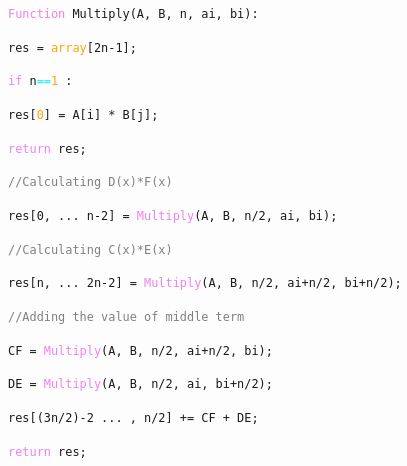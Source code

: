 \documentclass{article}
\theoremstyle{definition}
\theoremstyle{example}
\begin{document}
\vspace{3mm}
\noindent \texttt{\textcolor{violet}{Function} Multiply(A, B, n, ai, bi):} \par
\noindent \hspace{10mm} \texttt{res = \textcolor{orange}{array}[2n-1];}\par
\noindent \hspace{10mm} \texttt{\textcolor{violet}{if} n\textcolor{cyan}{==}\textcolor{orange}{1} :} \par
\noindent \hspace{20mm} \texttt{res[\textcolor{orange}{0}] = A[i] * B[j];} \par
\noindent \hspace{20mm} \texttt{\textcolor{violet}{return} res;} \par
\noindent \hspace{10mm} \texttt{\textcolor{gray}{//Calculating D(x)*F(x)}}\par
\noindent \hspace{10mm} \texttt{res[0, ... n-2] = \textcolor{violet}{Multiply}(A, B, n/2, ai, bi);}\par
\noindent \hspace{10mm} \texttt{\textcolor{gray}{//Calculating C(x)*E(x)}}\par
\noindent \hspace{10mm} \texttt{res[n, ... 2n-2] = \textcolor{violet}{Multiply}(A, B, n/2, ai+n/2, bi+n/2);}\par
\noindent \hspace{10mm} \texttt{\textcolor{gray}{//Adding the value of middle term}}\par
\noindent \hspace{10mm} \texttt{CF = \textcolor{violet}{Multiply}(A, B, n/2, ai+n/2, bi);}\par
\noindent \hspace{10mm} \texttt{DE = \textcolor{violet}{Multiply}(A, B, n/2, ai, bi+n/2);}\par
\noindent \hspace{10mm} \texttt{res[(3n/2)-2 ... , n/2] += CF + DE;}\par
\noindent \hspace{10mm} \texttt{\textcolor{violet}{return} res;}
\vspace{4mm}
\end{document}
